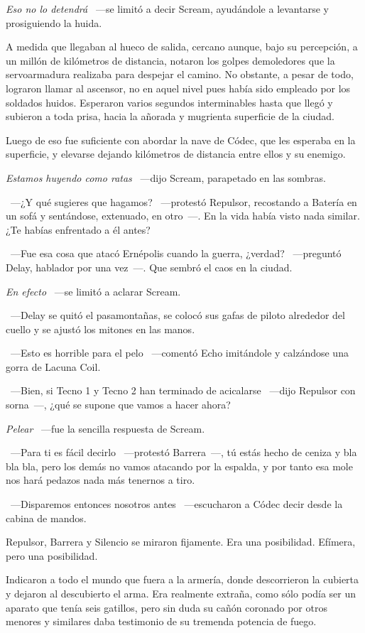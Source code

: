 \emph{Eso no lo detendrá} ~---se limitó a decir Scream, ayudándole a levantarse y prosiguiendo la huida.

A medida que llegaban al hueco de salida, cercano aunque, bajo su percepción, a un millón de kilómetros de distancia, notaron los golpes demoledores que la servoarmadura realizaba para despejar el camino. No obstante, a pesar de todo, lograron llamar al ascensor, no en aquel nivel pues había sido empleado por los soldados huidos. Esperaron varios segundos interminables hasta que llegó y subieron a toda prisa, hacia la añorada y mugrienta superficie de la ciudad.

Luego de eso fue suficiente con abordar la nave de Códec, que les esperaba en la superficie, y elevarse dejando kilómetros de distancia entre ellos y su enemigo.

\emph{Estamos huyendo como ratas} ~---dijo Scream, parapetado en las sombras.

~---¿Y qué sugieres que hagamos? ~---protestó Repulsor, recostando a Batería en un sofá y sentándose, extenuado, en otro~---. En la vida había visto nada similar. ¿Te habías enfrentado a él antes?

~---Fue esa cosa que atacó Ernépolis cuando la guerra, ¿verdad? ~---preguntó Delay, hablador por una vez~---. Que sembró el caos en la ciudad.

\emph{En efecto} ~---se limitó a aclarar Scream.

~---Delay se quitó el pasamontañas, se colocó sus gafas de piloto alrededor del cuello y se ajustó los mitones en las manos.

~---Esto es horrible para el pelo ~---comentó Echo imitándole y calzándose una gorra de Lacuna Coil.

~---Bien, si Tecno 1 y Tecno 2 han terminado de acicalarse ~---dijo Repulsor con sorna~---, ¿qué se supone que vamos a hacer ahora?

\emph{Pelear} ~---fue la sencilla respuesta de Scream.

~---Para ti es fácil decirlo ~---protestó Barrera~---, tú estás hecho de ceniza y bla bla bla, pero los demás no vamos atacando por la espalda, y por tanto esa mole nos hará pedazos nada más tenernos a tiro.

~---Disparemos entonces nosotros antes ~---escucharon a Códec decir desde la cabina de mandos.

Repulsor, Barrera y Silencio se miraron fijamente. Era una posibilidad. Efímera, pero una posibilidad.

Indicaron a todo el mundo que fuera a la armería, donde descorrieron la cubierta y dejaron al descubierto el arma. Era realmente extraña, como sólo podía ser un aparato que tenía seis gatillos, pero sin duda su cañón coronado por otros menores y similares daba testimonio de su tremenda potencia de fuego.

